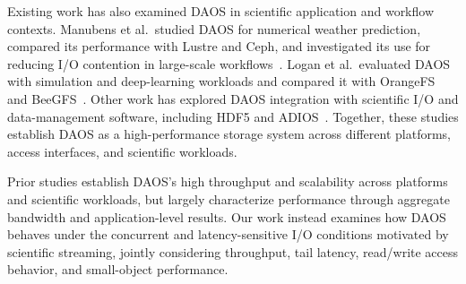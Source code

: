 Existing work has also examined DAOS in scientific application and workflow contexts. Manubens et al.\ studied DAOS for numerical weather prediction, compared its performance with Lustre and Ceph, and investigated its use for reducing I/O contention in large-scale workflows~\cite{daos-vs-lustre2022pdsw, hpc-weather2023ipdps, daos-hpc-storage2023cluster, manubens2024reducing}. Logan et al.\ evaluated DAOS with simulation and deep-learning workloads and compared it with OrangeFS and BeeGFS~\cite{XianheSun2023evaluation}. Other work has explored DAOS integration with scientific I/O and data-management software, including HDF5 and ADIOS~\cite{hdf5-daos2022tpds, daos-adios2024ISC}. Together, these studies establish DAOS as a high-performance storage system across different platforms, access interfaces, and scientific workloads.

Prior studies establish DAOS's high throughput and scalability across platforms and scientific workloads, but largely characterize performance through aggregate bandwidth and application-level results. Our work instead examines how DAOS behaves under the concurrent and latency-sensitive I/O conditions motivated by scientific streaming, jointly considering throughput, tail latency, read/write access behavior, and small-object performance.






